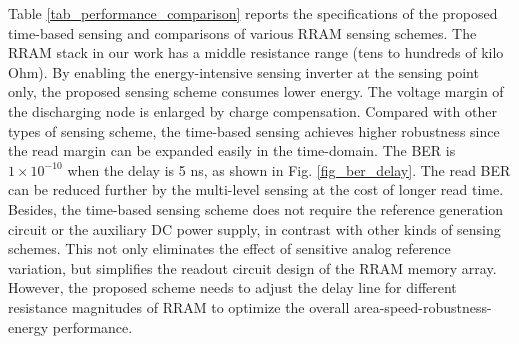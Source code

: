 Table \ref{tab_performance_comparison} reports the specifications of the proposed time-based sensing and comparisons of various RRAM sensing schemes. 
The RRAM stack in our work has a middle resistance range (tens to hundreds of kilo Ohm). By enabling the energy-intensive sensing inverter at the sensing point only, the proposed sensing scheme consumes lower energy. The voltage margin of the discharging node is enlarged by charge compensation. 
Compared with other types of sensing scheme, the time-based sensing achieves higher robustness since the read margin can be expanded easily in the time-domain. The BER is $1\times10^{-10}$ when the delay is 5 ns, as shown in Fig. \ref{fig_ber_delay}. The read BER can be reduced further by the multi-level sensing at the cost of longer read time. 
Besides, the time-based sensing scheme does not require the reference generation circuit or the auxiliary DC power supply, in contrast with other kinds of sensing schemes. This not only eliminates the effect of sensitive analog reference variation, but simplifies the readout circuit design of the RRAM memory array.
However, the proposed scheme needs to adjust the delay line for different resistance magnitudes of RRAM to optimize the overall area-speed-robustness-energy performance. 

